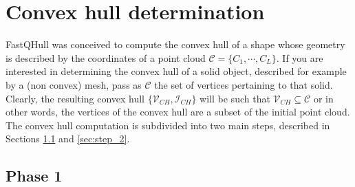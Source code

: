 \documentclass{article}
\begin{document}
\section{Convex hull determination}

FastQHull was conceived to compute the convex hull of a shape whose geometry is described by the coordinates of a point cloud $\mathcal{C} =  \lbrace C_1, \cdots, C_L  \rbrace$. If you are interested in determining the convex hull of a solid object, described for example by a (non convex) mesh, pass as $\mathcal{C}$ the set of vertices pertaining to that solid. Clearly, the resulting convex hull $ \lbrace \mathcal{V}_{CH} , \mathcal{I}_{CH}  \rbrace$ will be such that $\mathcal{V}_{CH} \subseteq \mathcal{C}$ or in other words, the vertices of the convex hull are a subset of the initial point cloud.
The convex hull computation is subdivided into two main steps, described in Sections \ref{sec:step_1} and \ref{sec:step_2}.

\subsection{Phase 1}
\label{sec:step_1}
\end{document}
